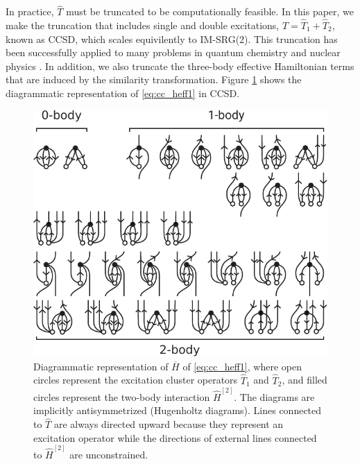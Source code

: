 In practice, $\hat{T}$ must be truncated to be computationally feasible.  In this paper, we make the truncation that includes single and double excitations, $\hat{T} = \hat{T}_{1} + \hat{T}_{2}$, known as CCSD, which scales equivilently to IM-SRG(2).  This truncation has been successfully applied to many problems in quantum chemistry \cite{RevModPhys.79.291} and nuclear physics \cite{0034-4885-77-9-096302}.  In addition, we also truncate the three-body effective Hamiltonian terms that are induced by the similarity transformation.  Figure \ref{fig:diagrams-ccsd} shows the diagrammatic representation of \eqref{eq:cc_heff1} in CCSD.

\begin{figure}
\includegraphics{fig-diagrams-ccsd}
\caption{Diagrammatic representation of $\overbar{H}$ of \eqref{eq:cc_heff1}, where open circles represent the excitation cluster operators $\hat{T}_{1}$ and $\hat{T}_{2}$, and filled circles represent the two-body interaction $\hat{H}^{[2]}$.  The diagrams are implicitly antisymmetrized (Hugenholtz diagrams).  Lines connected to $\hat{T}$ are always directed upward because they represent an excitation operator while the directions of external lines connected to $\hat{H}^{[2]}$ are unconstrained.}
\label{fig:diagrams-ccsd}
\end{figure}

